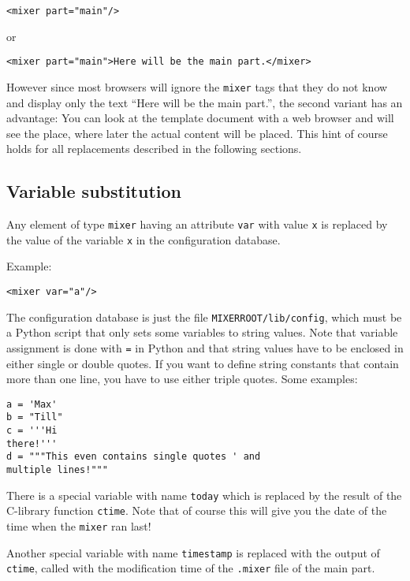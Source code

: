 \documentclass[a4paper,11pt]{article}
\newcommand{\MIXERROOT}{\texttt{MIXERROOT}}
\begin{document}
\hspace*{1cm} \verb!<mixer part="main"/>!

or

\hspace*{1cm} \verb!<mixer part="main">Here will be the main part.</mixer>!

However since most browsers will ignore the \verb!mixer! tags that they
do not know and display only the text "`Here will be the main part."',
the second variant has an advantage: You can look at the template document
with a web browser and will see the place, where later the actual
content will be placed. This hint of course holds for all replacements
described in the following sections.

\subsection{Variable substitution}

Any element of type \verb!mixer! having an attribute \verb!var! with
value \verb!x! is replaced by the value of the variable \verb!x! in 
the configuration database. 

Example:

\begin{verbatim}
<mixer var="a"/>
\end{verbatim}

The configuration database is just
the file \MIXERROOT\verb!/lib/config!, which must be a Python script
that only sets some variables to string values. Note that variable
assignment is done with \verb!=! in Python and that string values have
to be enclosed in either single or double quotes. If you want to
define string constants that contain more than one line, you have to
use either triple quotes. Some examples:

\begin{verbatim}
a = 'Max'
b = "Till"
c = '''Hi
there!'''
d = """This even contains single quotes ' and
multiple lines!"""
\end{verbatim}

There is a special variable with name \verb!today! which is replaced
by the result of the C-library function \verb!ctime!.  Note that of 
course this will give you the date of the time when the \verb!mixer!
ran last!

Another special variable with name \verb!timestamp! is replaced with
the output of \verb!ctime!, called with the modification time of the
\verb!.mixer! file of the main part.
\end{document}
